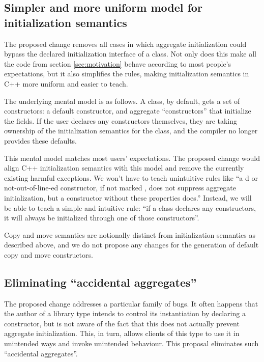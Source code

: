 \subsection{Simpler and more uniform model for initialization semantics}

The proposed change removes all cases in which aggregate initialization could bypass the declared initialization interface of a class. Not only does this make all the code from section \ref{sec:motivation} behave according to most people's expectations, but it also simplifies the rules, making initialization semantics in C++ more uniform and easier to teach.

The underlying mental model is as follows. A class, by default, gets a set of constructors: a default constructor, and aggregate ``constructors'' that initialize the fields. If the user declares any constructors themselves, they are taking ownership of the initialization semantics for the class, and the compiler no longer provides these defaults.

This mental model matches most users' expectations. The proposed change would align C++ initialization semantics with this model and remove the currently existing harmful exceptions. We won't have to teach unintuitive rules like ``a d or not-out-of-line-ed constructor, if not marked , does not suppress aggregate initialization, but a constructor without these properties does.'' Instead, we will be able to teach a simple and intuitive rule: ``if a class declares any constructors, it will always be initialized through one of those constructors''. 

Copy and move semantics are notionally distinct from initialization semantics as described above, and we do not propose any changes for the generation of default copy and move constructors.


\subsection{Eliminating ``accidental aggregates''}
\label{subsec:bugs}

The proposed change addresses a particular family of bugs. It often happens that the author of a library type intends to control its instantiation by declaring a constructor, but is not aware of the fact that this does not actually prevent aggregate initialization. This, in turn, allows clients of this type to use it in unintended ways and invoke unintended behaviour. This proposal eliminates such ``accidental aggregates''.

